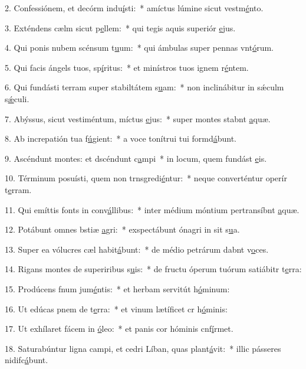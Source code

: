 2. Confessiónem, et decórm indu\uline{í}sti:~* amíctus lúmine sicut vestm\uline{é}nto.\par 
3. Exténdens cælm sicut p\uline{e}llem:~* qui tegis aquis superiór \uline{e}jus.\par 
4. Qui ponis nubem scénsum t\uline{u}um:~* qui ámbulas super pennas vnt\uline{ó}rum.\par 
5. Qui facis ángels tuos, sp\uline{í}ritus:~* et minístros tuos ignem r\uline{é}ntem.\par 
6. Qui fundásti terram super stabiltátem s\uline{u}am:~* non inclinábitur in sǽculm s\uline{ǽ}culi.\par 
7. Abýssus, sicut vestiméntum, míctus \uline{e}jus:~* super montes stabnt \uline{a}quæ.\par 
8. Ab increpatión tua f\uline{ú}gient:~* a voce tonítrui tui formd\uline{á}bunt.\par 
9. Ascéndunt montes: et dscéndunt c\uline{a}mpi~* in locum, quem fundást \uline{e}is.\par 
10. Términum posuísti, quem non trnsgredi\uline{é}ntur:~* neque converténtur operír t\uline{e}rram.\par 
11. Qui emíttis fonts in conv\uline{á}llibus:~* inter médium móntium pertransíbnt \uline{a}quæ.\par 
12. Potábunt omnes bstiæ \uline{a}gri:~* exspectábunt ónagri in sit s\uline{u}a.\par 
13. Super ea vólucres cæl habit\uline{á}bunt:~* de médio petrárum dabnt v\uline{o}ces.\par 
14. Rigans montes de superiribus s\uline{u}is:~* de fructu óperum tuórum satiábitr t\uline{e}rra:\par 
15. Prodúcens fnum jum\uline{é}ntis:~* et herbam servitút h\uline{ó}minum:\par 
16. Ut edúcas pnem de t\uline{e}rra:~* et vinum lætíficet cr h\uline{ó}minis:\par 
17. Ut exhílaret fácem in \uline{ó}leo:~* et panis cor hóminis cnf\uline{í}rmet.\par 
18. Saturabúntur ligna campi, et cedri Líban, quas plant\uline{á}vit:~* illic pásseres nidifc\uline{á}bunt.\par 
